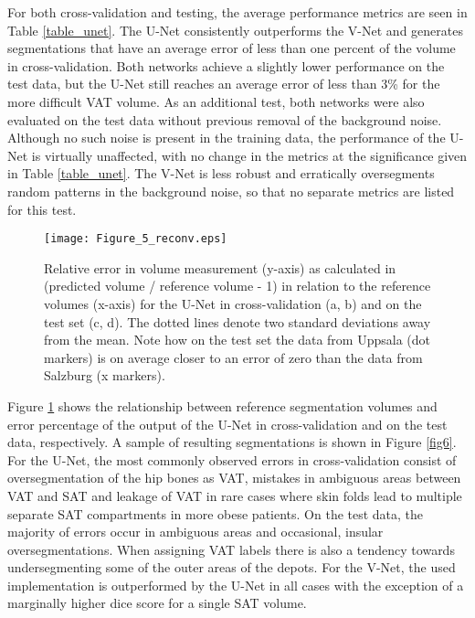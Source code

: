 \documentclass[10pt,letterpaper]{article}
\begin{document}
	For both cross-validation and testing, the average performance metrics are seen in Table \ref{table_unet}. The U-Net consistently outperforms the V-Net and generates segmentations that have an average error of less than one percent of the volume in cross-validation. Both networks achieve a slightly lower performance on the test data, but the U-Net still reaches an average error of less than 3\% for the more difficult VAT volume. As an additional test, both networks were also evaluated on the test data without previous removal of the background noise. Although no such noise is present in the training data, the performance of the U-Net is virtually unaffected, with no change in the metrics at the significance given in Table \ref{table_unet}. The V-Net is less robust and erratically oversegments random patterns in the background noise, so that no separate metrics are listed for this test.
				
	
	\begin{figure}[H] 
		\texttt{[image: Figure\_5\_reconv.eps]}
		
		\caption{Relative error in volume measurement (y-axis) as calculated in (predicted volume / reference volume - 1) in relation to the reference volumes (x-axis) for the U-Net in cross-validation (a, b) and on the test set (c, d). The dotted lines denote two standard deviations away from the mean. Note how on the test set the data from Uppsala (dot markers) is on average closer to an error of zero than the data from Salzburg (x markers).}
		
		\label{fig5} %
		
	\end{figure}
	Figure \ref{fig5} shows the relationship between reference segmentation volumes and error percentage of the output of the U-Net in cross-validation and on the test data, respectively. A sample of resulting segmentations is shown in Figure \ref{fig6}. For the U-Net, the most commonly observed errors in cross-validation consist of oversegmentation of the hip bones as VAT, mistakes in ambiguous areas between VAT and SAT and leakage of VAT in rare cases where skin folds lead to multiple separate SAT compartments in more obese patients. On the test data, the majority of errors occur in ambiguous areas and occasional, insular oversegmentations. When assigning VAT labels there is also a tendency towards undersegmenting some of the outer areas of the depots. For the V-Net, the used implementation is outperformed by the U-Net in all cases with the exception of a marginally higher dice score for a single SAT volume. \\
	
\end{document}
